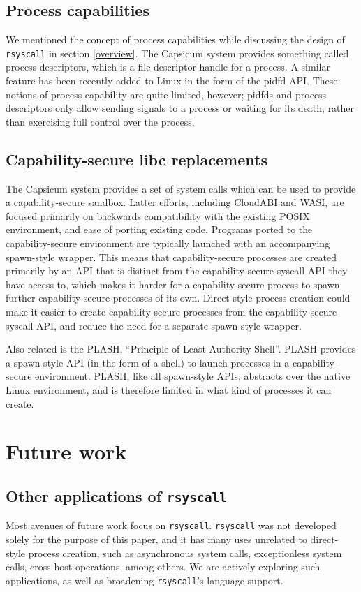 \documentclass[letterpaper,twocolumn,10pt]{article}
\begin{document}
\subsection{Process capabilities}
We mentioned the concept of process capabilities while discussing the design of \texttt{rsyscall} in section \ref{overview}.
The Capsicum system provides something called process descriptors\cite{capsicum},
which is a file descriptor handle for a process.
A similar feature has been recently added to Linux in the form of the pidfd API\cite{pidfd}.
These notions of process capability are quite limited, however;
pidfds and process descriptors only allow sending signals to a process or waiting for its death,
rather than exercising full control over the process.
\subsection{Capability-secure libc replacements}
The Capsicum system provides a set of system calls
which can be used to provide a capability-secure sandbox.\cite{capsicum}
Latter efforts\cite{oblivious}, including CloudABI\cite{cloudabi} and WASI\cite{wasi},
are focused primarily on backwards compatibility with the existing POSIX environment, and ease of porting existing code.
Programs ported to the capability-secure environment
are typically launched with an accompanying spawn-style wrapper.
This means that capability-secure processes are created primarily by an API
that is distinct from the capability-secure syscall API they have access to,
which makes it harder for a capability-secure process to spawn further capability-secure processes of its own.
Direct-style process creation could make it easier to create capability-secure processes 
from the capability-secure syscall API,
and reduce the need for a separate spawn-style wrapper.

Also related is the PLASH, ``Principle of Least Authority Shell''\cite{plash}.
PLASH provides a spawn-style API (in the form of a shell)
to launch processes in a capability-secure environment.
PLASH, like all spawn-style APIs, abstracts over the native Linux environment,
and is therefore limited in what kind of processes it can create.
\section{Future work}\label{future_work}
\subsection{Other applications of \texttt{rsyscall}}
Most avenues of future work focus on \texttt{rsyscall}.
\texttt{rsyscall} was not developed solely for the purpose of this paper,
and it has many uses unrelated to direct-style process creation,
such as asynchronous system calls, exceptionless system calls\cite{flexsc}, cross-host operations, among others.
We are actively exploring such applications,
as well as broadening \texttt{rsyscall}'s language support.
\end{document}
